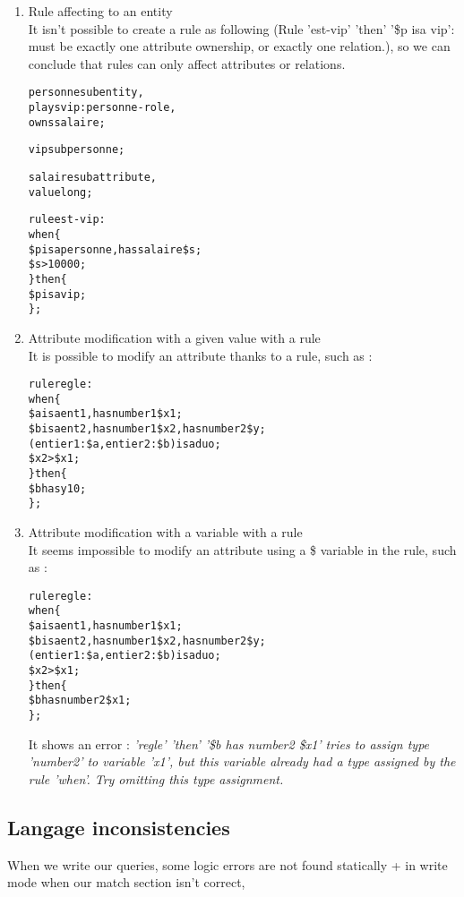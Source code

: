 \documentclass[runningheads]{llncs}
\begin{document}
\begin{enumerate}
\item Rule affecting to an entity \\
It isn't possible to create a rule as following (Rule 'est-vip' 'then' '\$p isa vip': must be exactly one attribute ownership, or exactly one relation.), so we can conclude that rules can only affect attributes or relations.
\begin{alltt}
personne sub entity,
    plays vip:personne-role,
    owns salaire;
    
vip sub personne;

salaire sub attribute,
  value long;

rule est-vip:
when \{
  \$p isa personne, has salaire \$s;
  \$s > 10000;
\} then \{
 \$p isa vip;
\};
\end{alltt}


\item Attribute modification with a given value with a rule \\
It is possible to modify an attribute thanks to a rule, such as :
\begin{alltt}
rule regle:
when \{
  \$a isa ent1, has number1 \$x1;
  \$b isa ent2, has number1 \$x2, has number2 \$y ;
  (entier1 : \$a , entier2 : \$b ) isa duo;
  \$x2 > \$x1;
\} then \{
 \$b has y 10;
\};
\end{alltt}


\item Attribute modification with a variable with a rule \\
It seems impossible to modify an attribute using a \$ variable in the rule, such as :
\begin{alltt}
rule regle:
when \{
  \$a isa ent1, has number1 \$x1;
  \$b isa ent2, has number1 \$x2, has number2 \$y ;
  (entier1 : \$a , entier2 : \$b ) isa duo;
  \$x2 > \$x1;
\} then \{
 \$b has number2 \$x1;
\};
\end{alltt}

It shows an error : \emph{'regle' 'then' '\$b has number2 \$x1' tries to assign type 'number2' to variable 'x1', but this variable already had a type assigned by the rule 'when'. Try omitting this type assignment.}





\end{enumerate}




\subsection{Langage inconsistencies}

When we write our queries, some logic errors are not found statically + in write mode when our match section isn't correct, 

























\end{document}
